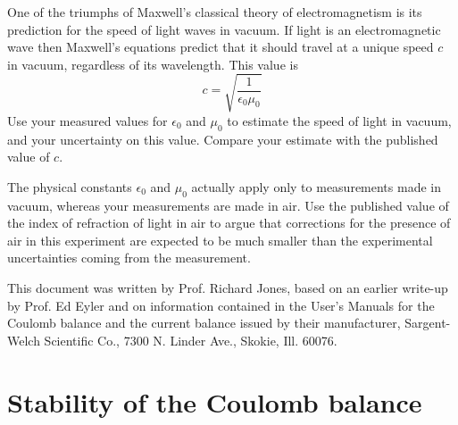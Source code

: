 \documentclass{revtex4}
\begin{document}
One of the triumphs of Maxwell's classical theory of electromagnetism
is its prediction for the speed of light waves in vacuum.  If light is
an electromagnetic wave then Maxwell's equations predict that it should
travel at a unique speed $c$ in vacuum, regardless of its wavelength.
This value is
\begin{equation}
c=\sqrt{\frac{1}{\epsilon_0\mu_0}}
\label{eq:c}
\end{equation}
Use your measured values for $\epsilon_0$ and $\mu_0$ to estimate the
speed of light in vacuum, and your uncertainty on this value.
Compare your estimate with the published value of $c$.

  The physical constants $\epsilon_0$ and
$\mu_0$ actually apply only to measurements made in vacuum, whereas
your measurements are made in air.  Use the published value of the index
of refraction of light in air to argue that corrections for the presence
of air in this experiment are expected to be much smaller than the
experimental uncertainties coming from the measurement.

\begin{acknowledgments}
This document was written by Prof. Richard Jones, based on an earlier
write-up by Prof. Ed Eyler and on information contained in the User's
Manuals for the Coulomb balance and the current balance issued by their
manufacturer, Sargent-Welch Scientific Co., 7300 N. Linder Ave., Skokie,
Ill. 60076.
\end{acknowledgments}

%

%
%
%
%
%

\newpage

\appendix
\section{Stability of the Coulomb balance}
\label{app:stability}
\setcounter{figure}{0}
\renewcommand*\thefigure{\Alph{section}.\arabic{figure}}
\end{document}
